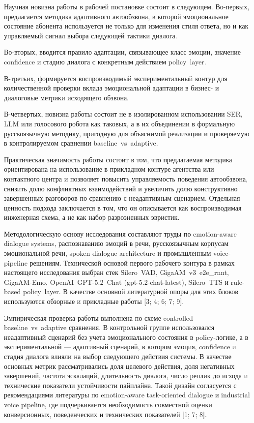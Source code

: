 \documentclass[a4paper,14pt]{extarticle}
\renewcommand{\texttt}[1]{\textnormal{#1}}
\begin{document}
Научная новизна работы в рабочей постановке состоит в следующем.
Во-первых, предлагается методика адаптивного автообзвона, в которой
эмоциональное состояние абонента используется не только для изменения
стиля ответа, но и как управляемый сигнал выбора следующей тактики
диалога.

Во-вторых, вводится правило адаптации, связывающее класс эмоции,
значение \texttt{confidence} и стадию диалога с конкретным действием
\texttt{policy\ layer}.

В-третьих, формируется воспроизводимый экспериментальный контур для
количественной проверки вклада эмоциональной адаптации в бизнес- и
диалоговые метрики исходящего обзвона.

В-четвертых, новизна работы состоит не в изолированном использовании
\texttt{SER}, \texttt{LLM} или голосового робота как таковых, а в их
объединении в формальную русскоязычную методику, пригодную для
объяснимой реализации и проверяемую в контролируемом сравнении
\texttt{baseline\ vs\ adaptive}.

Практическая значимость работы состоит в том, что предлагаемая методика
ориентирована на использование в прикладном контуре агентства или
контактного центра и позволяет повысить управляемость поведения
автообзвона, снизить долю конфликтных взаимодействий и увеличить долю
конструктивно завершенных разговоров по сравнению с неадаптивным
сценарием. Отдельная ценность подхода заключается в том, что он
описывается как воспроизводимая инженерная схема, а не как набор
разрозненных эвристик.

Методологическую основу исследования составляют труды по emotion-aware
dialogue systems, распознаванию эмоций в речи, русскоязычным корпусам
эмоциональной речи, spoken dialogue architecture и промышленным
voice-pipeline решениям. Технической основой первого рабочего контура в
рамках настоящего исследования выбран стек \texttt{Silero\ VAD},
\texttt{GigaAM\ v3\ e2e\_rnnt}, \texttt{GigaAM-Emo},
\texttt{OpenAI\ GPT-5.2\ Chat} (\texttt{gpt-5.2-chat-latest}),
\texttt{Silero\ TTS} и rule-based \texttt{policy\ layer}. В качестве
основной литературной опоры для этих блоков используются обзорные и
прикладные работы {[}3; 4; 6; 7; 9{]}.

Эмпирическая проверка работы выполнена по схеме controlled
\texttt{baseline\ vs\ adaptive} сравнения. В контрольной группе
использовался неадаптивный сценарий без учета эмоционального состояния в
policy-логике, а в экспериментальной --- адаптивный сценарий, в котором
эмоция, \texttt{confidence} и стадия диалога влияли на выбор следующего
действия системы. В качестве основных метрик рассматривались доля
целевого действия, доля негативных завершений, частота эскалаций,
длительность диалога, число реплик до исхода и технические показатели
устойчивости пайплайна. Такой дизайн согласуется с рекомендациями
литературы по emotion-aware task-oriented dialogue и industrial voice
pipeline, где подчеркивается необходимость совместной оценки
конверсионных, поведенческих и технических показателей {[}1; 7; 8{]}.
\end{document}
